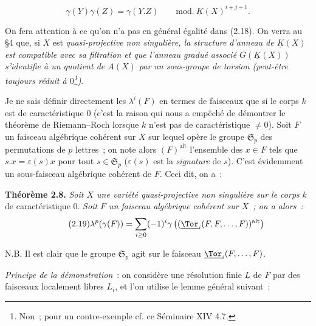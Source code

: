 \begin{equation}\tag{2.18}
 \gamma(Y)\gamma(Z)=\gamma(Y.Z)\qquad\mathrm{mod.}\ \underline K(X)^{i+j+1}.
\end{equation}

On
fera attention à ce qu'on n'a pas en général égalité dans (2.18). On verra au \S 4 que, si $X$ est \emph{quasi-projective non singulière, la structure d'anneau de $\underline K(X)$ est compatible avec sa filtration et que l'anneau gradué associé $G(\underline K(X))$ s'identifie à un quotient de $A(X)$ par un sous-groupe de torsion (peut-être toujours réduit à $0$\footnote{Non~; pour un contre-exemple cf. ce Séminaire XIV 4.7.})}.

Je ne sais définir directement les $\lambda^i(F)$ en termes de faisceaux que si le corps $k$ est de caractéristique $0$ (c'est la raison qui nous a empêché de démontrer le théorème de Riemann--Roch lorsque $k$ n'est pas de caractéristique $\neq0$). Soit $F$ un faisceau algébrique cohérent sur $X$ sur lequel opère le groupe $\mathfrak S_p$ des permutations de $p$ lettres~; on note alors $(F)^{\mathrm{alt}}$ l'ensemble des $x\in F$ tels que $s.x=\varepsilon(s)x$ pour tout $s\in\mathfrak S_p$ ($\varepsilon(s)$ est la \emph{signature} de $s$). C'est évidemment un sous-faisceau algébrique cohérent de $F$. Ceci dit, on a~:

\textbf{Théorème 2.8.} \emph{Soit $X$ une variété quasi-projective non singulière sur le corps} $k$ de caractéristique $0$. \emph{Soit $F$ un faisceau algébrique cohérent sur $X$~; on a alors~:}
\begin{equation}\tag{2.19}
 \lambda^p(\gamma(F))=\sum_{i\geq0}(-1)^i\gamma\left((\underline{\Tor}_i(F,F,\ldots,F))^{\mathrm{alt}}\right)
\end{equation}

N.B. Il est clair que le groupe $\mathfrak S_p$ agit sur le faisceau $\underline{\Tor}_i(F,\ldots,F)$.

\emph{Principe de la démonstration}~: on considère une résolution finie $\underline L$ de $F$ par des faisceaux localement libres $L_i$, et l'on utilise le lemme général suivant~:

